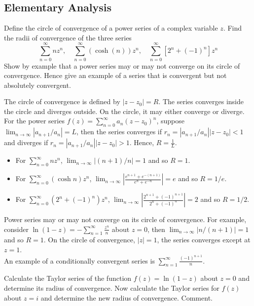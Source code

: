 \documentclass[a4paper]{article}
\begin{document}
\subsection*{Elementary Analysis}
\begin{qns}
Define the circle of convergence of a power series of a complex variable $z$. Find the radii of convergence of the three series
$$\sum_{n=0}^\infty nz^n,\quad\sum_{n=0}^\infty(\cosh(n))z^n,\quad\sum_{n=0}^\infty[2^n+(-1)^n]z^n$$
Show by example that a power series may or may not converge on its circle of convergence. Hence give an example of a series that is convergent but not absolutely convergent.
\end{qns}
\begin{ans}
The circle of convergence is defined by $|z-z_0|=R$. The series converges inside the circle and diverges outside. On the circle, it may either converge or diverge. For the power series $f(z)=\sum_{n=0}^\infty a_n(z-z_0)^n$, suppose $\lim_{n\rightarrow\infty}|a_{n+1}/a_n|=L$, then the series converges if $r_n=|a_{n+1}/a_n||z-z_0|<1$ and diverges if $r_n=|a_{n+1}/a_n||z-z_0|>1$. Hence, $R=\frac{1}{L}$. \begin{itemize}
    \item For $\sum_{n=0}^\infty nz^n$, $\lim_{n\rightarrow\infty}|(n+1)/n|=1$ and so $R=1$.
    \item For $\sum_{n=0}^\infty (\cosh n)z^n$, $\lim_{n\rightarrow\infty}|\frac{e^{n+1}+e^{-(n+1)}}{e^n+e^{-n}}|=e$ and so $R=1/e$.
    \item For $\sum_{n=0}^\infty (2^n+(-1)^n)z^n$, $\lim_{n\rightarrow\infty}|\frac{2^{n+1}+(-1)^{n+1}}{2^n+(-1)^n}|=2$ and so $R=1/2$.
\end{itemize}  
Power series may or may not converge on its circle of convergence. For example, consider $\ln(1-z)=-\sum_{n=1}^\infty\frac{z^n}{n}$ about $z=0$, then $\lim_{n\rightarrow\infty}|n/(n+1)|=1$ and so $R=1$. On the circle of convergence, $|z|=1$, the series converges except at $z=1$.\\[5pt]
An example of a conditionally convergent series is $\sum_{n=1}^\infty\frac{(-1)^{n+1}}{n}$.
\end{ans}
\begin{qns}
Calculate the Taylor series of the function $f(z)=\ln(1-z)$ about $z = 0$ and determine its radius of convergence. Now calculate the Taylor series for $f(z)$ about $z = i$ and determine the new radius of convergence. Comment.
\end{qns}
\end{document}
